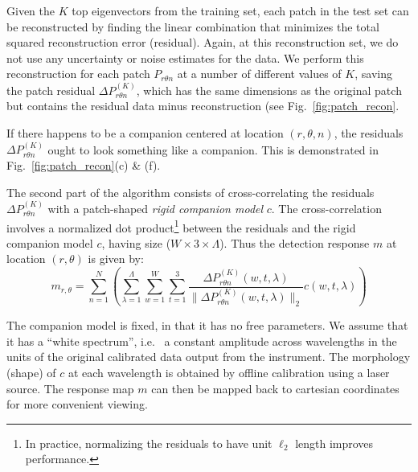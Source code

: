 \documentclass[12pt,pdftex,preprint]{aastex}
\newcommand{\fig}[1]{Fig.\ \ref{fig:#1}}
\begin{document}
Given the $K$ top eigenvectors from the training set, each patch in
the test set can be reconstructed by finding the linear combination
that minimizes the total squared reconstruction error (residual).
Again, at this reconstruction set, we do not use any uncertainty or
noise estimates for the data.  We perform this reconstruction for each
patch $P_{r \theta n}$ at a number of different values of $K$, saving
the patch residual $\Delta P^{(K)}_{r \theta n}$, which has the same
dimensions as the original patch but contains the residual data minus
reconstruction (see \fig{patch_recon}.

If there happens to be a companion centered at location $(r, \theta,
n)$, the residuals $\Delta P^{(K)}_{r \theta n}$ ought to look something
like a companion. This is demonstrated in \fig{patch_recon}(c) \& (f).

The second part of the algorithm consists of cross-correlating the residuals $\Delta P^{(K)}_{r \theta n}$ with a
patch-shaped \emph{rigid companion model} $c$.  The cross-correlation
involves a normalized dot product\footnote{In practice, normalizing the
residuals to have unit $\ell_2$ length improves performance.} between the residuals and the
rigid companion model $c$, having size ($W \times 3 \times \Lambda$). Thus the
detection response $m$ at location $(r,\theta)$ is given by:
\begin{equation}
m_{r,\theta} = \sum_{n=1}^N ( \sum^\Lambda_{\lambda=1}
\sum_{w=1}^W \sum_{t=1}^3 \frac{\Delta
P^{(K)}_{r \theta n}(w,t,\lambda)}{\|\Delta
P^{(K)}_{r \theta n}(w,t,\lambda) \|_2} c(w,t,\lambda) ) 
\end{equation}

The companion model is fixed, in that it has no free parameters. We
assume that it has a ``white spectrum'', i.e.~ a
constant amplitude across wavelengths in the units of the original
calibrated data output from the instrument. The morphology (shape) of
$c$ at each wavelength is obtained by offline calibration using a
laser source. The response map $m$ can then be mapped back to cartesian coordinates
for more convenient viewing.
\end{document}
